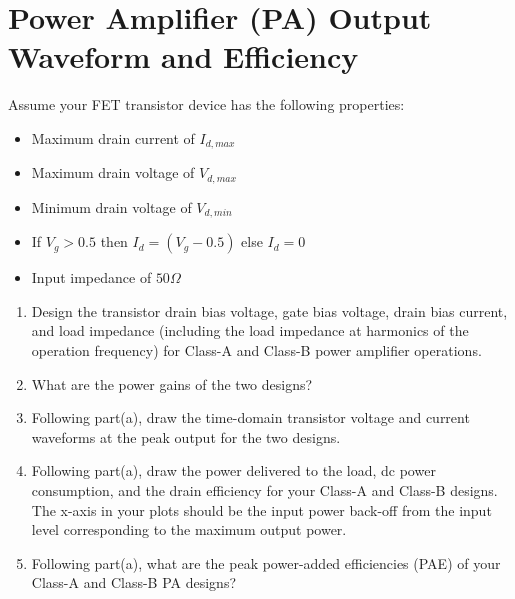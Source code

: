\section{Power Amplifier (PA) Output Waveform and Efficiency}
{\color{blue} Assume your FET transistor device has the following properties:
\begin{itemize}
    \item Maximum drain current of $I_{d,max}$
    \item Maximum drain voltage of $V_{d,max}$
    \item Minimum drain voltage of $V_{d,min}$
    \item If $V_g > 0.5$ then $I_d = (V_g - 0.5)$ else $I_d = 0$
    \item Input impedance of $50 \Omega$
\end{itemize}}

\begin{enumerate}[label=(\alph*)]
    \item {\color{blue} Design the transistor drain bias voltage, gate bias voltage, drain bias current, and load impedance (including the load impedance at harmonics of the operation frequency) for Class-A and Class-B power amplifier operations.}

    \item {\color{blue} What are the power gains of the two designs?}

    \item {\color{blue} Following part(a), draw the time-domain transistor voltage and current waveforms at the peak output for the two designs.}

    \item {\color{blue} Following part(a), draw the power delivered to the load, dc power consumption, and the drain efficiency for your Class-A and Class-B designs. The x-axis in your plots should be the input power back-off from the input level corresponding to the maximum output power.}

    \item {\color{blue} Following part(a), what are the peak power-added efficiencies (PAE) of your Class-A and Class-B PA designs?}
\end{enumerate}


